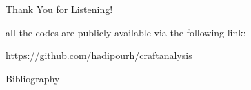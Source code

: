 \documentclass{beamer}
\begin{document}
\begin{frame}
\Huge{\centerline{Thank You for Listening!}}
\begin{center}
\small{all the codes are publicly available via the following link:


\href{https://github.com/hadipourh/craftanalysis}{https://github.com/hadipourh/craftanalysis}}    
\end{center}
\end{frame}

\begin{frame}{Bibliography}


\end{frame}

\end{document}
